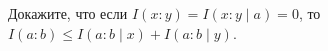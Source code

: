 Докажите, что если $I(x : y) = I(x : y \mid a) = 0$, то 
$I(a : b) \le I(a : b \mid x) + I(a : b \mid y)$.